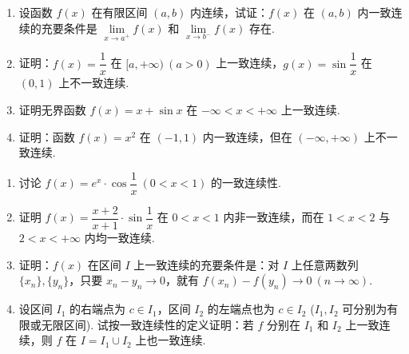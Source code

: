 \begin{enumerate}[label=\textbf{\arabic*.}, itemsep=4.5cm]
    \item 设函数 $f(x)$ 在有限区间 $(a,b)$ 内连续，试证：$f(x)$ 在 $(a,b)$ 内一致连续的充要条件是 $\lim\limits_{x \to a^+} f(x)$ 和 $\lim\limits_{x \to b^-} f(x)$ 存在.

    \item 证明：$f(x) = \dfrac{1}{x}$ 在 $[a, +\infty) \ (a > 0)$ 上一致连续，$g(x) = \sin \dfrac{1}{x}$ 在 $(0,1)$ 上不一致连续.

    \item 证明无界函数 $f(x) = x + \sin x$ 在 $-\infty < x < +\infty$ 上一致连续.

    \item 证明：函数 $f(x) = x^2$ 在 $(-1,1)$ 内一致连续，但在 $(-\infty, +\infty)$ 上不一致连续.
\end{enumerate}

\newpage

\begin{enumerate}[label=\textbf{\arabic*.}, itemsep=4.5cm, resume]
    \item 讨论 $f(x) = e^x \cdot \cos \dfrac{1}{x} \ (0 < x < 1)$ 的一致连续性.

    \item 证明 $f(x) = \dfrac{x+2}{x+1} \cdot \sin \dfrac{1}{x}$ 在 $0 < x < 1$ 内非一致连续，而在 $1 < x < 2$ 与 $2 < x < +\infty$ 内均一致连续.

    \item 证明：$f(x)$ 在区间 $I$ 上一致连续的充要条件是：对 $I$ 上任意两数列 $\{x_n\}, \{y_n\}$，只要 $x_n - y_n \to 0$，就有 $f(x_n) - f(y_n) \to 0 \ (n \to \infty)$.

    \item 设区间 $I_1$ 的右端点为 $c \in I_1$，区间 $I_2$ 的左端点也为 $c \in I_2$ ($I_1, I_2$ 可分别为有限或无限区间). 试按一致连续性的定义证明：若 $f$ 分别在 $I_1$ 和 $I_2$ 上一致连续，则 $f$ 在 $I = I_1 \cup I_2$ 上也一致连续.
\end{enumerate}

\newpage

